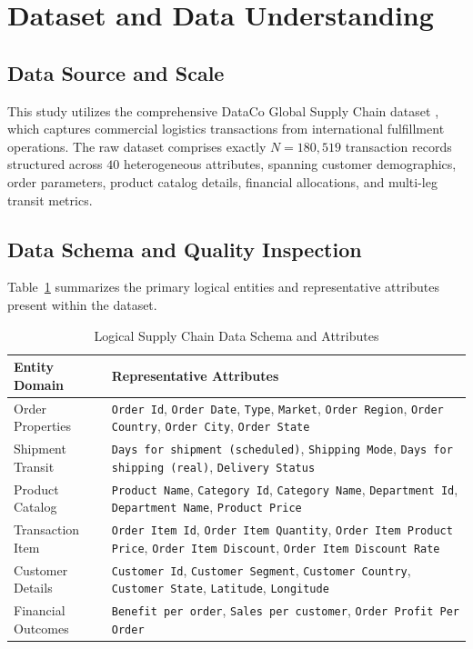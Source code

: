 \documentclass[journal,10pt,twocolumn]{IEEEtran}
\begin{document}
\section{Dataset and Data Understanding}
\label{sec:dataset}

\subsection{Data Source and Scale}
This study utilizes the comprehensive DataCo Global Supply Chain dataset \cite{constante2019dataco}, which captures commercial logistics transactions from international fulfillment operations. The raw dataset comprises exactly $N = 180,519$ transaction records structured across $40$ heterogeneous attributes, spanning customer demographics, order parameters, product catalog details, financial allocations, and multi-leg transit metrics.

\subsection{Data Schema and Quality Inspection}
Table~\ref{tab:schema} summarizes the primary logical entities and representative attributes present within the dataset.

\begin{table}[htbp]
\caption{Logical Supply Chain Data Schema and Attributes}
\label{tab:schema}
\centering
\begin{tabularx}{\columnwidth}{lX}
\toprule
\textbf{Entity Domain} & \textbf{Representative Attributes} \\
\midrule
Order Properties & \texttt{Order Id}, \texttt{Order Date}, \texttt{Type}, \texttt{Market}, \texttt{Order Region}, \texttt{Order Country}, \texttt{Order City}, \texttt{Order State} \\
Shipment Transit & \texttt{Days for shipment (scheduled)}, \texttt{Shipping Mode}, \texttt{Days for shipping (real)}, \texttt{Delivery Status} \\
Product Catalog & \texttt{Product Name}, \texttt{Category Id}, \texttt{Category Name}, \texttt{Department Id}, \texttt{Department Name}, \texttt{Product Price} \\
Transaction Item & \texttt{Order Item Id}, \texttt{Order Item Quantity}, \texttt{Order Item Product Price}, \texttt{Order Item Discount}, \texttt{Order Item Discount Rate} \\
Customer Details & \texttt{Customer Id}, \texttt{Customer Segment}, \texttt{Customer Country}, \texttt{Customer State}, \texttt{Latitude}, \texttt{Longitude} \\
Financial Outcomes & \texttt{Benefit per order}, \texttt{Sales per customer}, \texttt{Order Profit Per Order} \\
\bottomrule
\end{tabularx}
\end{table}
\end{document}
